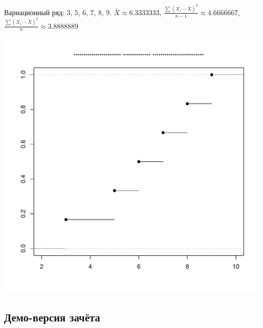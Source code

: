 \documentclass[12pt, a4paper]{article}\usepackage[]{graphicx}\usepackage[]{color}
\makeatletter
\def\maxwidth{ %
  \ifdim\Gin@nat@width>\linewidth
    \linewidth
  \else
    \Gin@nat@width
  \fi
}
\newenvironment{kframe}{%
 \def\at@end@of@kframe{}%
 \ifinner\ifhmode%
  \def\at@end@of@kframe{\end{minipage}}%
  \begin{minipage}{\columnwidth}%
 \fi\fi%
 \def\FrameCommand##1{\hskip\@totalleftmargin \hskip-\fboxsep
 \colorbox{shadecolor}{##1}\hskip-\fboxsep
     \hskip-\linewidth \hskip-\@totalleftmargin \hskip\columnwidth}%
 \MakeFramed {\advance\hsize-\width
   \@totalleftmargin\z@ \linewidth\hsize
   \@setminipage}}%
 {\par\unskip\endMakeFramed%
 \at@end@of@kframe}
\makeatother
\begin{document}
\begin{enumerate}
Вариационный ряд: 3, 5, 6, 7, 8, 9. $\bar{X}\approx 6.3333333$,
$\frac{\sum (X_i-\bar{X})^2}{n-1}\approx 4.6666667$,
$\frac{\sum (X_i-\bar{X})^2}{n}\approx 3.8888889$




\begin{kframe}


{\ttfamily\noindent\bfseries\color{errorcolor}{\#\# Error: Cannot create:\\\#\# 	 R\_plots/empirical\_cdf.tikz \\\#\# Because the directory does not exist or is not writable.}}\end{kframe}
\includegraphics[width=\maxwidth]{figure/empirical_cdf-1} 


\begin{figure}
\begin{tikzpicture}[scale = 0.025]
  
\end{tikzpicture}
\end{figure}
\end{enumerate}

\subsection{Демо-версия зачёта}
\end{document}

